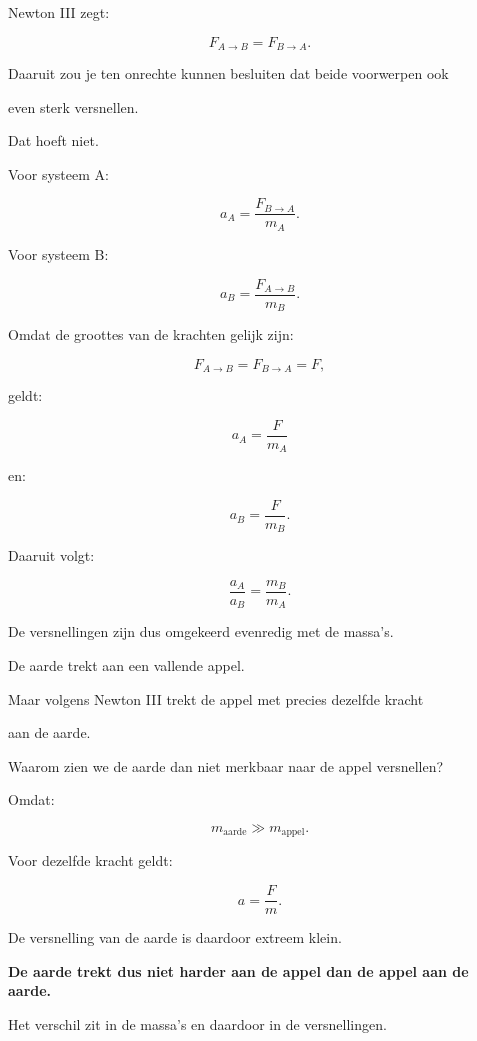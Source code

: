 \documentclass{ximera}
\begin{document}



Newton III zegt:

\[F_{A\rightarrow B} = F_{B\rightarrow A}.\]

Daaruit zou je ten onrechte kunnen besluiten dat beide voorwerpen ook

even sterk versnellen.

Dat hoeft niet.

Voor systeem A:

\[a_A = \frac{F_{B\rightarrow A}}{m_A}.\]

Voor systeem B:

\[a_B = \frac{F_{A\rightarrow B}}{m_B}.\]

Omdat de groottes van de krachten gelijk zijn:

\[F_{A\rightarrow B} = F_{B\rightarrow A} = F,\]

geldt:

\[a_A=\frac{F}{m_A}\]

en:

\[a_B=\frac{F}{m_B}.\]

Daaruit volgt:

\[\boxed{ \frac{a_A}{a_B} = \frac{m_B}{m_A}. }\]

De versnellingen zijn dus omgekeerd evenredig met de massa's.


\begin{voorbeeld}

De aarde trekt aan een vallende appel.

Maar volgens Newton III trekt de appel met precies dezelfde kracht

aan de aarde.

Waarom zien we de aarde dan niet merkbaar naar de appel versnellen?

Omdat:

\[m_{\mathrm{aarde}}\gg m_{\mathrm{appel}}.\]

Voor dezelfde kracht geldt:

\[a=\frac{F}{m}.\]

De versnelling van de aarde is daardoor extreem klein.

\begin{center}

\textbf{De aarde trekt dus niet harder aan de appel dan de appel aan de aarde.}

\end{center}

Het verschil zit in de massa's en daardoor in de versnellingen.

\end{voorbeeld}
\end{document}
